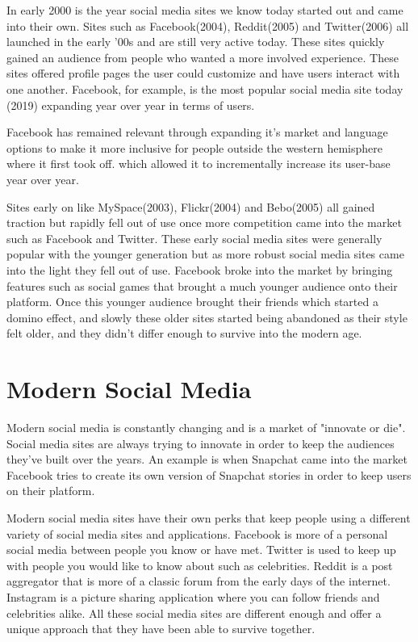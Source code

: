 In early 2000 is the year social media sites we know today started out and came into their own. Sites such as Facebook(2004), Reddit(2005) and Twitter(2006) all launched in the early '00s and are still very active today. These sites quickly gained an audience from people who wanted a more involved experience. These sites offered profile pages the user could customize and have users interact with one another. Facebook, for example, is the most popular social media site today (2019) expanding year over year in terms of users.

Facebook has remained relevant through expanding it's market and language options to make it more inclusive for people outside the western hemisphere where it first took off. which allowed it to incrementally increase its user-base year over year.

Sites early on like MySpace(2003), Flickr(2004) and Bebo(2005) all gained traction but rapidly fell out of use once more competition came into the market such as Facebook and Twitter. These early social media sites were generally popular with the younger generation but as more robust social media sites came into the light they fell out of use. Facebook broke into the market by bringing features such as social games that brought a much younger audience onto their platform. Once this younger audience brought their friends which started a domino effect, and slowly these older sites started being abandoned as their style felt older, and they didn't differ enough to survive into the modern age.

\section{Modern Social Media}
Modern social media is constantly changing and is a market of "innovate or die". Social media sites are always trying to innovate in order to keep the audiences they've built over the years. An example is when Snapchat came into the market Facebook tries to create its own version of Snapchat stories in order to keep users on their platform.

Modern social media sites have their own perks that keep people using a different variety of social media sites and applications. Facebook is more of a personal social media between people you know or have met. Twitter is used to keep up with people you would like to know about such as celebrities. Reddit is a post aggregator that is more of a classic forum from the early days of the internet. Instagram is a picture sharing application where you can follow friends and celebrities alike. All these social media sites are different enough and offer a unique approach that they have been able to survive together. 

